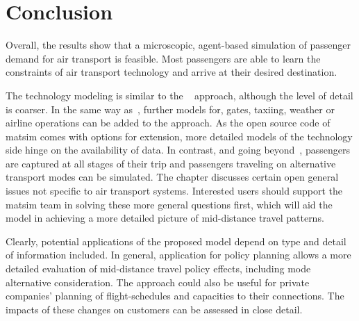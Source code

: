 \section{Conclusion}
Overall, the results show that a microscopic, agent-based simulation of passenger demand for air transport is feasible. 
Most passengers are able to learn the constraints of air transport technology and arrive at their desired destination.

The technology modeling is similar to the ~\citet{ClarkeEtAl2007AirNetworkSim} approach, although the level of detail is coarser. 
In the same way as~\citet{ClarkeEtAl2007AirNetworkSim}, further models for, \eg gates, taxiing, weather or airline operations can be added to the approach. 
As the open source code of \gls{matsim} comes with options for extension, more detailed models of the technology side hinge on the availability of data. 
In contrast, and going beyond~\citet{ClarkeEtAl2007AirNetworkSim}, passengers are captured at all stages of their trip and 
passengers traveling on alternative transport modes can be simulated. 
The chapter discusses certain open general issues not specific to air transport systems. 
Interested users should support the \gls{matsim} team in solving these more general questions first, which will aid  
the model in achieving a more detailed picture of mid-distance travel patterns.

Clearly, potential applications of the proposed model depend on type and detail of information included. 
In general, application for policy planning allows a more detailed evaluation of mid-distance travel policy effects,  including mode alternative consideration. 
The approach could also be useful for private companies' planning of flight-schedules and capacities to their connections. 
The impacts of these changes on customers can be assessed in close detail. 


